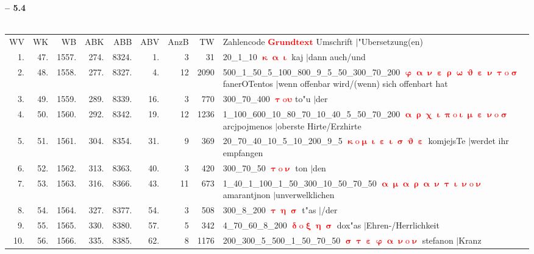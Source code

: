 \documentclass[a4paper,10pt,landscape]{article}
\begin{document}
\newpage 
{\bf -- 5.4}\\
\medskip \\
\begin{tabular}{rrrrrrrrp{120mm}}
WV&WK&WB&ABK&ABB&ABV&AnzB&TW&Zahlencode \textcolor{red}{$\boldsymbol{Grundtext}$} Umschrift $|$"Ubersetzung(en)\\
1.&47.&1557.&274.&8324.&1.&3&31&20\_1\_10 \textcolor{red}{$\boldsymbol{\upkappa\upalpha\upiota}$} kaj $|$dann auch/und\\
2.&48.&1558.&277.&8327.&4.&12&2090&500\_1\_50\_5\_100\_800\_9\_5\_50\_300\_70\_200 \textcolor{red}{$\boldsymbol{\upvarphi\upalpha\upnu\upepsilon\uprho\upomega\upvartheta\upepsilon\upnu\uptau\mathrm{o}\upsigma}$} fanerOTentos $|$wenn offenbar wird/(wenn) sich offenbart hat\\
3.&49.&1559.&289.&8339.&16.&3&770&300\_70\_400 \textcolor{red}{$\boldsymbol{\uptau\mathrm{o}\upsilon}$} to"u $|$der\\
4.&50.&1560.&292.&8342.&19.&12&1236&1\_100\_600\_10\_80\_70\_10\_40\_5\_50\_70\_200 \textcolor{red}{$\boldsymbol{\upalpha\uprho\upchi\upiota\uppi\mathrm{o}\upiota\upmu\upepsilon\upnu\mathrm{o}\upsigma}$} arcjpojmenos $|$oberste Hirte/Erzhirte\\
5.&51.&1561.&304.&8354.&31.&9&369&20\_70\_40\_10\_5\_10\_200\_9\_5 \textcolor{red}{$\boldsymbol{\upkappa\mathrm{o}\upmu\upiota\upepsilon\upiota\upsigma\upvartheta\upepsilon}$} komjejsTe $|$werdet ihr empfangen\\
6.&52.&1562.&313.&8363.&40.&3&420&300\_70\_50 \textcolor{red}{$\boldsymbol{\uptau\mathrm{o}\upnu}$} ton $|$den\\
7.&53.&1563.&316.&8366.&43.&11&673&1\_40\_1\_100\_1\_50\_300\_10\_50\_70\_50 \textcolor{red}{$\boldsymbol{\upalpha\upmu\upalpha\uprho\upalpha\upnu\uptau\upiota\upnu\mathrm{o}\upnu}$} amarantjnon $|$unverwelklichen\\
8.&54.&1564.&327.&8377.&54.&3&508&300\_8\_200 \textcolor{red}{$\boldsymbol{\uptau\upeta\upsigma}$} t"as $|$/der\\
9.&55.&1565.&330.&8380.&57.&5&342&4\_70\_60\_8\_200 \textcolor{red}{$\boldsymbol{\updelta\mathrm{o}\upxi\upeta\upsigma}$} dox"as $|$Ehren-/Herrlichkeit\\
10.&56.&1566.&335.&8385.&62.&8&1176&200\_300\_5\_500\_1\_50\_70\_50 \textcolor{red}{$\boldsymbol{\upsigma\uptau\upepsilon\upvarphi\upalpha\upnu\mathrm{o}\upnu}$} stefanon $|$Kranz\\
\end{tabular}\medskip \\
\end{document}
